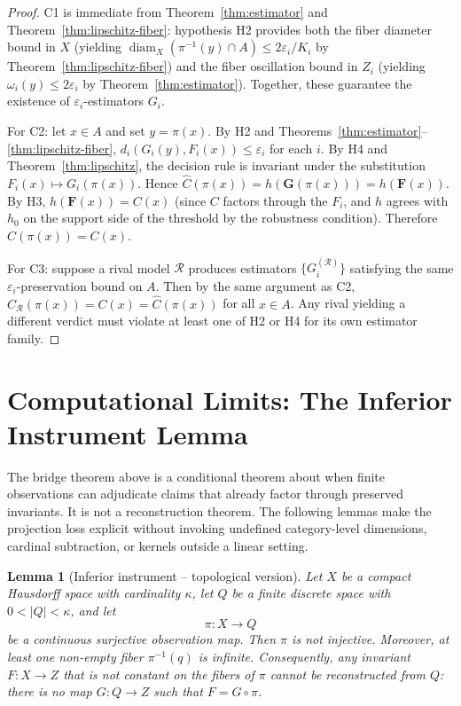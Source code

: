 \documentclass[11pt]{article}
\newtheorem{lemma}{Lemma}
\begin{document}
\begin{proof}
C1 is immediate from Theorem~\ref{thm:estimator} and Theorem~\ref{thm:lipschitz-fiber}: hypothesis H2 provides both the fiber diameter bound in $X$ (yielding $\operatorname{diam}_X(\pi^{-1}(y)\cap A)\leq 2\varepsilon_i/K_i$ by Theorem~\ref{thm:lipschitz-fiber}) and the fiber oscillation bound in $Z_i$ (yielding $\omega_i(y)\leq 2\varepsilon_i$ by Theorem~\ref{thm:estimator}). Together, these guarantee the existence of $\varepsilon_i$-estimators $G_i$.

For C2: let $x\in A$ and set $y=\pi(x)$. By H2 and Theorems~\ref{thm:estimator}--\ref{thm:lipschitz-fiber}, $d_i(G_i(y),F_i(x))\leq\varepsilon_i$ for each $i$. By H4 and Theorem~\ref{thm:lipschitz}, the decision rule is invariant under the substitution $F_i(x)\mapsto G_i(\pi(x))$. Hence $\hat{C}(\pi(x))=h(\mathbf{G}(\pi(x)))=h(\mathbf{F}(x))$. By H3, $h(\mathbf{F}(x))=C(x)$ (since $C$ factors through the $F_i$, and $h$ agrees with $h_0$ on the support side of the threshold by the robustness condition). Therefore $\hat{C}(\pi(x))=C(x)$.

For C3: suppose a rival model $\mathcal{R}$ produces estimators $\{G_i^{(\mathcal{R})}\}$ satisfying the same $\varepsilon_i$-preservation bound on $A$. Then by the same argument as C2, $\hat{C}_{\mathcal{R}}(\pi(x))=C(x)=\hat{C}(\pi(x))$ for all $x\in A$. Any rival yielding a different verdict must violate at least one of H2 or H4 for its own estimator family.
\end{proof}

\section{Computational Limits: The Inferior Instrument Lemma}
\label{sec:inferior-instrument}

The bridge theorem above is a conditional theorem about when finite observations can adjudicate claims that already factor through preserved invariants. It is not a reconstruction theorem. The following lemmas make the projection loss explicit without invoking undefined category-level dimensions, cardinal subtraction, or kernels outside a linear setting.

\begin{lemma}[Inferior instrument -- topological version]\label{lem:inferior-instrument-topological}
Let $X$ be a compact Hausdorff space with cardinality $\kappa$, let $Q$ be a finite discrete space with $0<|Q|<\kappa$, and let
\[
\pi\colon X\to Q
\]
be a continuous surjective observation map. Then $\pi$ is not injective. Moreover, at least one non-empty fiber $\pi^{-1}(q)$ is infinite. Consequently, any invariant $F\colon X\to Z$ that is not constant on the fibers of $\pi$ cannot be reconstructed from $Q$: there is no map $G\colon Q\to Z$ such that $F=G\circ\pi$.
\end{lemma}
\end{document}
